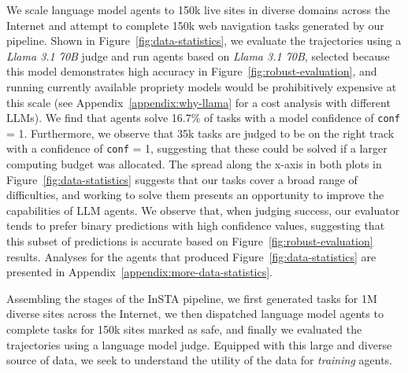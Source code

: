 We scale language model agents to 150k live sites in diverse domains across the Internet and attempt to complete 150k web navigation tasks generated by our pipeline. Shown in Figure~\ref{fig:data-statistics}, we evaluate the trajectories using a \textit{Llama 3.1 70B} judge and run agents based on \textit{Llama 3.1 70B}, selected because this model demonstrates high accuracy in Figure~\ref{fig:robust-evaluation}, and running currently available propriety models would be prohibitively expensive at this scale (see Appendix~\ref{appendix:why-llama} for a cost analysis with different LLMs). We find that agents solve 16.7\% of tasks with a model confidence of \texttt{conf} = 1. Furthermore, we observe that 35k tasks are judged to be on the right track with a confidence of \texttt{conf} = 1, suggesting that these could be solved if a larger computing budget was allocated. The spread along the x-axis in both plots in Figure~\ref{fig:data-statistics} suggests that our tasks cover a broad range of difficulties, and working to solve them presents an opportunity to improve the capabilities of LLM agents. We observe that, when judging success, our evaluator tends to prefer binary predictions with high confidence values, suggesting that this subset of predictions is accurate based on Figure~\ref{fig:robust-evaluation} results. Analyses for the agents that produced Figure~\ref{fig:data-statistics} are presented in Appendix~\ref{appendix:more-data-statistics}.


Assembling the stages of the InSTA pipeline, we first generated tasks for 1M diverse sites across the Internet, we then dispatched language model agents to complete tasks for 150k sites marked as safe, and finally we evaluated the trajectories using a language model judge. Equipped with this large and diverse source of data, we seek to understand the utility of the data for \textit{training} agents.